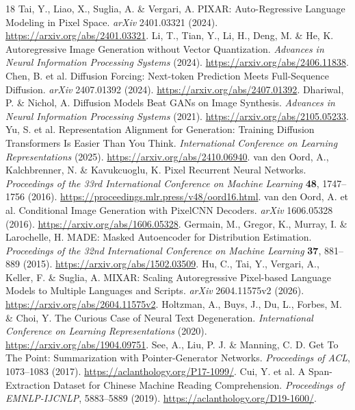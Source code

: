 \begin{thebibliography}{18}
\small
{}
 Tai, Y., Liao, X., Suglia, A. \& Vergari, A. PIXAR: Auto-Regressive Language Modeling in Pixel Space. \emph{arXiv} 2401.03321 (2024). \url{https://arxiv.org/abs/2401.03321}.
 Li, T., Tian, Y., Li, H., Deng, M. \& He, K. Autoregressive Image Generation without Vector Quantization. \emph{Advances in Neural Information Processing Systems} (2024). \url{https://arxiv.org/abs/2406.11838}.
 Chen, B. et al. Diffusion Forcing: Next-token Prediction Meets Full-Sequence Diffusion. \emph{arXiv} 2407.01392 (2024). \url{https://arxiv.org/abs/2407.01392}.
 Dhariwal, P. \& Nichol, A. Diffusion Models Beat GANs on Image Synthesis. \emph{Advances in Neural Information Processing Systems} (2021). \url{https://arxiv.org/abs/2105.05233}.
 Yu, S. et al. Representation Alignment for Generation: Training Diffusion Transformers Is Easier Than You Think. \emph{International Conference on Learning Representations} (2025). \url{https://arxiv.org/abs/2410.06940}.
 van den Oord, A., Kalchbrenner, N. \& Kavukcuoglu, K. Pixel Recurrent Neural Networks. \emph{Proceedings of the 33rd International Conference on Machine Learning} \textbf{48}, 1747--1756 (2016). \url{https://proceedings.mlr.press/v48/oord16.html}.
 van den Oord, A. et al. Conditional Image Generation with PixelCNN Decoders. \emph{arXiv} 1606.05328 (2016). \url{https://arxiv.org/abs/1606.05328}.
 Germain, M., Gregor, K., Murray, I. \& Larochelle, H. MADE: Masked Autoencoder for Distribution Estimation. \emph{Proceedings of the 32nd International Conference on Machine Learning} \textbf{37}, 881--889 (2015). \url{https://arxiv.org/abs/1502.03509}.
 Hu, C., Tai, Y., Vergari, A., Keller, F. \& Suglia, A. MIXAR: Scaling Autoregressive Pixel-based Language Models to Multiple Languages and Scripts. \emph{arXiv} 2604.11575v2 (2026). \url{https://arxiv.org/abs/2604.11575v2}.
 Holtzman, A., Buys, J., Du, L., Forbes, M. \& Choi, Y. The Curious Case of Neural Text Degeneration. \emph{International Conference on Learning Representations} (2020). \url{https://arxiv.org/abs/1904.09751}.
 See, A., Liu, P. J. \& Manning, C. D. Get To The Point: Summarization with Pointer-Generator Networks. \emph{Proceedings of ACL}, 1073--1083 (2017). \url{https://aclanthology.org/P17-1099/}.
 Cui, Y. et al. A Span-Extraction Dataset for Chinese Machine Reading Comprehension. \emph{Proceedings of EMNLP-IJCNLP}, 5883--5889 (2019). \url{https://aclanthology.org/D19-1600/}.

\end{thebibliography}
